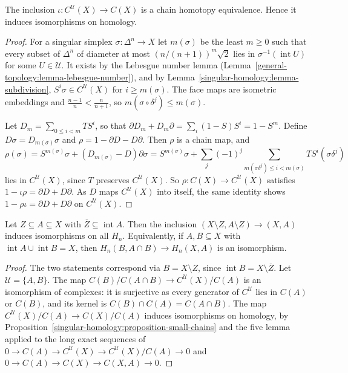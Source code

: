 \begin{proposition}\label{singular-homology:proposition-small-chains}
The inclusion $\iota \colon C^{\mathcal{U}}(X) \to C(X)$ is a chain homotopy equivalence. Hence it induces isomorphisms on homology.
\end{proposition}

\begin{proof}
For a singular simplex $\sigma \colon \Delta^n \to X$ let $m(\sigma)$ be the least $m \geq 0$ such that every subset of $\Delta^n$ of diameter at most $(n/(n+1))^m\sqrt2$ lies
in $\sigma^{-1}(\operatorname{int}U)$ for some $U \in \mathcal{U}$. It exists by the Lebesgue number lemma (Lemma~\ref{general-topology:lemma-lebesgue-number}), and
by Lemma~\ref{singular-homology:lemma-subdivision}, $S^i\sigma \in C^{\mathcal{U}}(X)$ for $i \geq m(\sigma)$. The face maps are isometric embeddings and
$\frac{n-1}{n} < \frac{n}{n+1}$, so $m(\sigma \circ \delta^j) \leq m(\sigma)$.

Let $D_m = \sum_{0 \leq i < m}TS^i$, so that $\partial D_m + D_m\partial = \sum_i(1 - S)S^i = 1 - S^m$. Define $D\sigma = D_{m(\sigma)}\sigma$ and $\rho = 1 - \partial D - D\partial$. Then
$\rho$ is a chain map, and
\[
\rho(\sigma) = S^{m(\sigma)}\sigma + (D_{m(\sigma)} - D)\partial\sigma = S^{m(\sigma)}\sigma + \sum_j (-1)^j\sum_{m(\sigma\delta^j) \leq i < m(\sigma)} TS^i(\sigma\delta^j)
\]
lies in $C^{\mathcal{U}}(X)$, since $T$ preserves $C^{\mathcal{U}}(X)$. So $\rho \colon C(X) \to C^{\mathcal{U}}(X)$ satisfies $1 - \iota\rho = \partial D + D\partial$. As $D$ maps
$C^{\mathcal{U}}(X)$ into itself, the same identity shows $1 - \rho\iota = \partial D + D\partial$ on $C^{\mathcal{U}}(X)$.
\end{proof}

\begin{theorem}[Excision]\label{singular-homology:theorem-excision}
Let $Z \subseteq A \subseteq X$ with $\overline{Z} \subseteq \operatorname{int}A$. Then the inclusion $(X \setminus Z, A \setminus Z) \to (X, A)$ induces isomorphisms on all
$H_n$. Equivalently, if $A, B \subseteq X$ with $\operatorname{int}A \cup \operatorname{int}B = X$, then $H_n(B, A \cap B) \to H_n(X, A)$ is an isomorphism.
\end{theorem}

\begin{proof}
The two statements correspond via $B = X \setminus Z$, since $\operatorname{int}B = X \setminus \overline{Z}$. Let $\mathcal{U} = \{A, B\}$. The map
$C(B)/C(A \cap B) \to C^{\mathcal{U}}(X)/C(A)$ is an isomorphism of complexes: it is surjective as every generator of $C^{\mathcal{U}}$ lies in $C(A)$ or $C(B)$, and its
kernel is $C(B) \cap C(A) = C(A \cap B)$. The map $C^{\mathcal{U}}(X)/C(A) \to C(X)/C(A)$ induces isomorphisms on homology, by
Proposition~\ref{singular-homology:proposition-small-chains} and the five lemma applied to the long exact sequences of $0 \to C(A) \to C^{\mathcal{U}}(X) \to C^{\mathcal{U}}(X)/C(A) \to 0$
and $0 \to C(A) \to C(X) \to C(X, A) \to 0$.
\end{proof}

